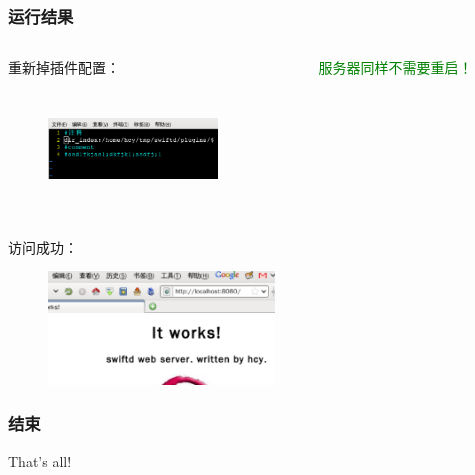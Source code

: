 \documentclass[10pt,dvipdfm]{beamer}
\begin{document}
\begin{frame}
	\frametitle{运行结果}
	\begin{columns}
		\begin{column}{0.6\textwidth}
			\begin{block}{重新掉插件配置：}
			\begin{figure}[htbp]
			\centering
			\includegraphics[height=3cm, width=4.5cm]{pics/uncomplugin.eps}
			\end{figure}
			\end{block}
		\end{column}
		
		\begin{column}{0.3\textwidth}
			\textcolor{green}{服务器同样不需要重启！}
		\end{column}
	\end{columns}
	
	\begin{block}{访问成功：}
	\begin{figure}[htbp]
	\centering
	\includegraphics[height=3cm, width=6cm]{pics/dirindex.eps}
	\end{figure}
	\end{block}
\end{frame}
\begin{frame}
	\frametitle{结束}
	\begin{center}
	{\Huge
		That's all!
	}
	\end{center}
\end{frame}
\end{document}
